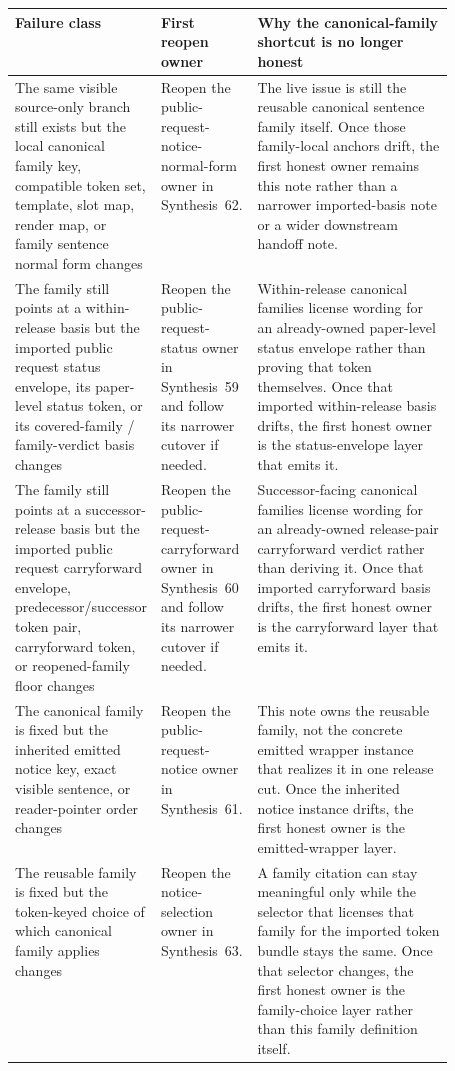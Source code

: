 \documentclass[11pt]{article}
\begin{document}
\begin{table}[t]
\centering
\small
\begin{tabularx}{\linewidth}{@{}p{0.29\linewidth}p{0.22\linewidth}X@{}}
\toprule
Failure class & First reopen owner & Why the canonical-family shortcut is no longer honest \\
\midrule
The same visible source-only branch still exists but the local canonical family key, compatible token set, template, slot map, render map, or family sentence normal form changes & Reopen the public-request-notice-normal-form owner in Synthesis~62. & The live issue is still the reusable canonical sentence family itself. Once those family-local anchors drift, the first honest owner remains this note rather than a narrower imported-basis note or a wider downstream handoff note. \\
The family still points at a within-release basis but the imported public request status envelope, its paper-level status token, or its covered-family / family-verdict basis changes & Reopen the public-request-status owner in Synthesis~59 and follow its narrower cutover if needed. & Within-release canonical families license wording for an already-owned paper-level status envelope rather than proving that token themselves. Once that imported within-release basis drifts, the first honest owner is the status-envelope layer that emits it. \\
The family still points at a successor-release basis but the imported public request carryforward envelope, predecessor/successor token pair, carryforward token, or reopened-family floor changes & Reopen the public-request-carryforward owner in Synthesis~60 and follow its narrower cutover if needed. & Successor-facing canonical families license wording for an already-owned release-pair carryforward verdict rather than deriving it. Once that imported carryforward basis drifts, the first honest owner is the carryforward layer that emits it. \\
The canonical family is fixed but the inherited emitted notice key, exact visible sentence, or reader-pointer order changes & Reopen the public-request-notice owner in Synthesis~61. & This note owns the reusable family, not the concrete emitted wrapper instance that realizes it in one release cut. Once the inherited notice instance drifts, the first honest owner is the emitted-wrapper layer. \\
The reusable family is fixed but the token-keyed choice of which canonical family applies changes & Reopen the notice-selection owner in Synthesis~63. & A family citation can stay meaningful only while the selector that licenses that family for the imported token bundle stays the same. Once that selector changes, the first honest owner is the family-choice layer rather than this family definition itself. \\

\end{tabularx}
\end{table}
\end{document}
